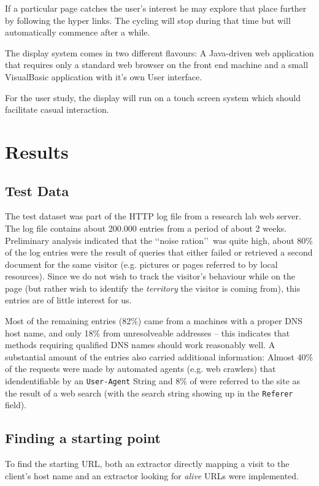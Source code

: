 \documentclass[a4paper]{danarticle}
\begin{document}
      If a particular page catches the user's interest he may explore that place
      further by following the hyper links. The cycling will stop during that
      time but will automatically commence after a while.
      
      The display system comes in two different flavours: A Java-driven web
      application that requires only a standard web browser on the front end
      machine and a small VisualBasic application with it's own User interface.
      
      For the user study, the display will run on a touch screen system which
      should facilitate casual interaction.
  \section*{Results}
    \subsection*{Test Data}
      The test dataset was part of the HTTP log file from a research lab
      web server. The log file contains about 200.000 entries from a period of
      about 2 weeks. Preliminary analysis indicated that the 
      \lq\lq noise ration\rq\rq\ was quite high, about 80\% of the log entries
      were the result of queries that either failed or retrieved a second
      document for the same visitor (e.g. pictures or pages referred to by local
      resources). Since we do not wish to track the visitor's behaviour while
      on the page (but rather wish to identify the \textit{territory} the
      visitor is coming from), this entries are of little interest for us.
      
      Most of the remaining entries (82\%) came from a machines with a proper
      DNS host name, and only 18\% from unresolveable addresses -- this indicates
      that methods requiring qualified DNS names should work reasonably well. A
      substantial amount of the entries also carried additional information:
      Almost 40\% of the requests were made by automated agents (e.g. web
      crawlers) that idendentifiable by an \verb$User-Agent$ String and 8\% of
      were referred to the site as the result of a web search (with the search
      string showing up in the \verb$Referer$ field).
    \subsection*{Finding a starting point}
      To find the starting URL, both an extractor directly 
      mapping a visit to the
      client's host name and an extractor looking for \textit{alive} URLs were
      implemented. 
      
\end{document}
